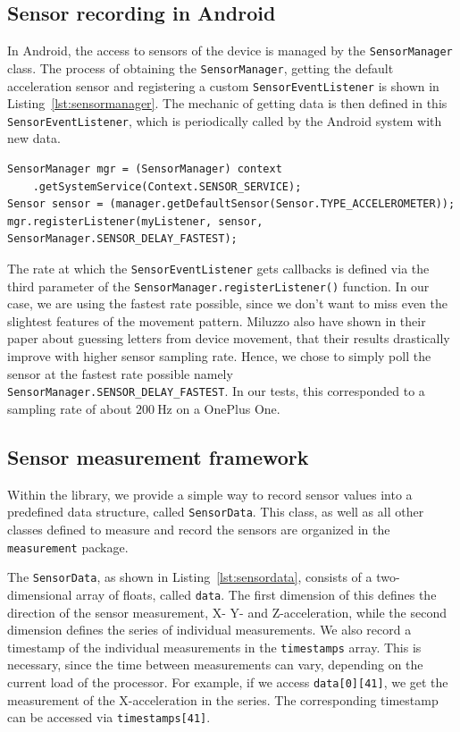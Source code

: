 \subsection{Sensor recording in Android}\label{subsection:sensorrecording}
In Android, the access to sensors of the device is managed by the \lstinline$SensorManager$ class. The process of obtaining the \lstinline$SensorManager$, getting the default acceleration sensor and registering a custom \lstinline$SensorEventListener$ is shown in Listing~\ref{lst:sensormanager}. The mechanic of getting data is then defined in this \lstinline$SensorEventListener$, which is periodically called by the Android system with new data.

\begin{lstlisting}[float,
caption={Obtaining the default acceleration sensor data in Android},
label={lst:sensormanager}]
SensorManager mgr = (SensorManager) context
    .getSystemService(Context.SENSOR_SERVICE);
Sensor sensor = (manager.getDefaultSensor(Sensor.TYPE_ACCELEROMETER));
mgr.registerListener(myListener, sensor, SensorManager.SENSOR_DELAY_FASTEST);
\end{lstlisting}

The rate at which the \lstinline$SensorEventListener$ gets callbacks is defined via the third parameter of the \lstinline$SensorManager.registerListener()$ function. In our case, we are using the fastest rate possible, since we don't want to miss even the slightest features of the movement pattern. Miluzzo \etal\cite{miluzzo2012tapprints} also have shown in their paper about guessing letters from device movement, that their results drastically improve with higher sensor sampling rate. Hence, we chose to simply poll the sensor at the fastest rate possible namely \lstinline$SensorManager.SENSOR_DELAY_FASTEST$. In our tests, this corresponded to a sampling rate of about $\SI{200}{\hertz}$ on a OnePlus One.

\subsection{Sensor measurement framework}
Within the library, we provide a simple way to record sensor values into a predefined data structure, called \lstinline$SensorData$. This class, as well as all other classes defined to measure and record the sensors are organized in the \lstinline$measurement$ package.

The \lstinline$SensorData$, as shown in Listing~\ref{lst:sensordata}, consists of a two-dimensional array of floats, called \lstinline$data$. The first dimension of this defines the direction of the sensor measurement, \ie X- Y- and Z-acceleration, while the second dimension defines the series of individual measurements. We also record a timestamp of the individual measurements in the \lstinline$timestamps$ array. This is necessary, since the time between measurements can vary, depending on the current load of the processor.
For example, if we access \lstinline$data[0][41]$, we get the  measurement of the X-acceleration in the series. The corresponding timestamp can be accessed via \lstinline$timestamps[41]$.

